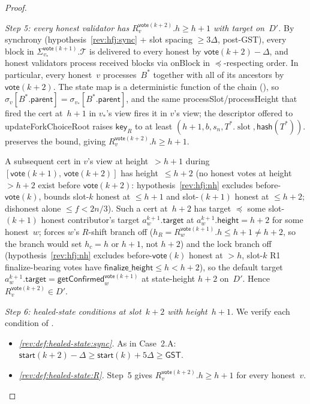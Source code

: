 \ifx\litemode\undefined\documentclass{article}\fi
\newcommand{\T}[0]{\ensuremath{\mathcal{T}}}
\newcommand{\slot}[0]{\ensuremath{\operatorname{\mathrm{slot}}}}
\newcommand{\target}{\mathsf{target}}
\newcommand{\height}{\mathsf{height}}
\newcommand{\parent}{\mathsf{parent}}
\newcommand{\finalizeHeight}{\mathsf{finalize\_height}}
\newcommand{\hash}{\mathsf{hash}}
\newcommand{\key}{\mathsf{key}}
\newcommand{\start}{\mathsf{start}}
\newcommand{\vote}{\mathsf{vote}}
\newcommand{\updateForkChoiceRoot}{\textsf{updateForkChoiceRoot}\xspace}
\newcommand{\getConfirmed}{\textsf{getConfirmed}\xspace}
\theoremstyle{plain}
\theoremstyle{definition}
\theoremstyle{remark}
\newcommand{\GST}{\ensuremath{\mathsf{GST}}}
\begin{document}
\begin{proof}
\begin{description}
\begin{description}
\emph{Step 5: every honest validator has $R_v^{\vote(k+2)}.h \geq h+1$ with target on~$D'$.}
By synchrony (hypothesis~\ref{rev:hfj:sync} + slot spacing $\geq 3\Delta$, post-GST), every block in $\Sigma_{v_*}^{\vote(k+1)}.\T$ is delivered to every honest by $\vote(k+2) - \Delta$, and honest validators process received blocks via onBlock in $\preceq$-respecting order. In particular, every honest~$v$ processes~$B^*$ together with all of its ancestors by $\vote(k+2)$. The state map is a deterministic function of the chain (), so $\sigma_v[B^*.\parent] = \sigma_{v_*}[B^*.\parent]$, and the same processSlot/processHeight that fired the cert at~$h+1$ in $v_*$'s view fires it in $v$'s view; the descriptor offered to \updateForkChoiceRoot raises $\key_R$ to at least $(h+1, b, s_n, T^*.\slot, \hash(T^*))$.  preserves the bound, giving $R_v^{\vote(k+2)}.h \geq h+1$.

A subsequent cert in $v$'s view at height~$>h+1$ during $[\vote(k+1),\, \vote(k+2)]$ has height~$\leq h+2$ (no honest votes at height~$>h+2$ exist before $\vote(k+2)$: hypothesis~\ref{rev:hfj:nh} excludes before-$\vote(k)$,  bounds slot-$k$ honest at $\leq h+1$ and slot-$(k+1)$ honest at $\leq h+2$; dishonest alone $\leq f < 2n/3$). Such a cert at~$h+2$ has target $\preceq$ some slot-$(k+1)$ honest contributor's target $a^{k+1}_w.\target$ at $a^{k+1}_w.\height = h+2$ for some honest~$w$;  forces $w$'s $R$-shift branch off ($h_R = R_w^{\vote(k+1)}.h \leq h+1 \neq h+2$, so the branch would set $h_c = h$ or $h+1$, not $h+2$) and the lock branch off (hypothesis~\ref{rev:hfj:nh} excludes before-$\vote(k)$ honest at $>h$, slot-$k$ R1 finalize-bearing votes have $\finalizeHeight \leq h < h+2$), so the default target $a^{k+1}_w.\target = \getConfirmed_w^{\vote(k+1)}$ at state-height $h+2$ on~$D'$. Hence $R_v^{\vote(k+2)} \in D'$.

\emph{Step 6: healed-state conditions at slot~$k+2$ with height~$h+1$.}
We verify each condition of .
\begin{itemize}
  \item \emph{\ref{rev:def:healed-state:sync}.} As in Case~2.A: $\start(k+2) - \Delta \geq \start(k) + 5\Delta \geq \GST$.

  \item \emph{\ref{rev:def:healed-state:R}.} Step~5 gives $R_v^{\vote(k+2)}.h \geq h+1$ for every honest~$v$.


\end{itemize}
\end{description}
\end{description}
\end{proof}
\end{document}
